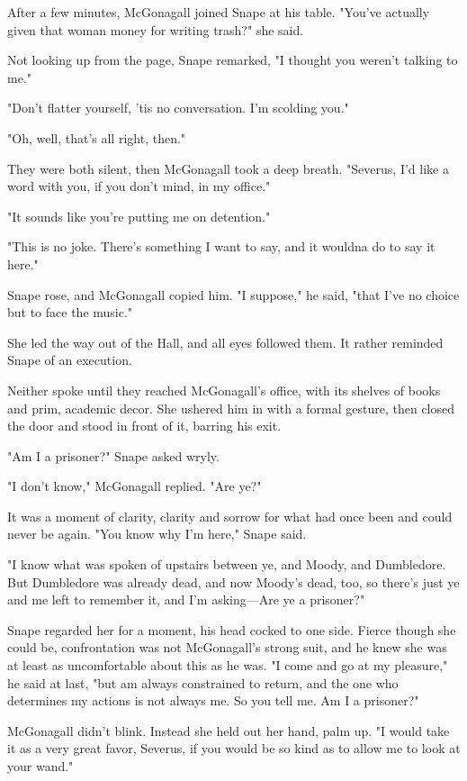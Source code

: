 After a few minutes, McGonagall joined Snape at his table. "You've actually given that woman money for writing trash?" she said.

Not looking up from the page, Snape remarked, "I thought you weren't talking to me."

"Don't flatter yourself, 'tis no conversation. I'm scolding you."

"Oh, well, that's all right, then."

They were both silent, then McGonagall took a deep breath. "Severus, I'd like a word with you, if you don't mind, in my office."

"It sounds like you're putting me on detention."

"This is no joke. There's something I want to say, and it wouldna do to say it here."

Snape rose, and McGonagall copied him. "I suppose," he said, "that I've no choice but to face the music."

She led the way out of the Hall, and all eyes followed them. It rather reminded Snape of an execution.

Neither spoke until they reached McGonagall's office, with its shelves of books and prim, academic decor. She ushered him in with a formal gesture, then closed the door and stood in front of it, barring his exit.

"Am I a prisoner?" Snape asked wryly.

"I don't know," McGonagall replied. "Are ye?"

It was a moment of clarity, clarity and sorrow for what had once been and could never be again. "You know why I'm here," Snape said.

"I know what was spoken of upstairs between ye, and Moody, and Dumbledore. But Dumbledore was already dead, and now Moody's dead, too, so there's just ye and me left to remember it, and I'm asking—Are ye a prisoner?"

Snape regarded her for a moment, his head cocked to one side. Fierce though she could be, confrontation was not McGonagall's strong suit, and he knew she was at least as uncomfortable about this as he was. "I come and go at my pleasure," he said at last, "but am always constrained to return, and the one who determines my actions is not always me. So you tell me. Am I a prisoner?"

McGonagall didn't blink. Instead she held out her hand, palm up. "I would take it as a very great favor, Severus, if you would be so kind as to allow me to look at your wand."

